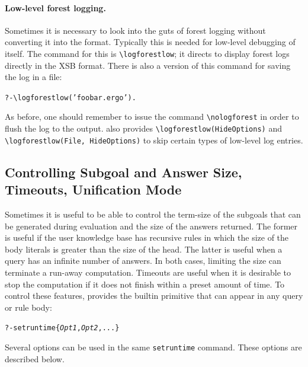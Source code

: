 \documentclass[11pt]{article}
\newcommand{\ERGO}{\mbox{\smaller{\ensuremath{\cal{E}}\smaller{{\sc{RGO}}}}}\xspace}
\newcommand{\FLSYSTEM}{\ERGO}
\newcommand{\ergoext}{ergo\xspace}
\newcommand{\bs}{\textbackslash}
\begin{document}
\paragraph{Low-level forest logging.}
Sometimes it is necessary to look into the guts of forest logging without
converting it into the \FLSYSTEM format. Typically this is needed for
low-level debugging of \FLSYSTEM itself.
The command for this is
{\tt \bs{}logforestlow}; it directs \FLSYSTEM to display forest logs 
directly in the XSB format.
There is also a version of this command for saving the log in a file:
\begin{alltt}
   ?- \bs{}logforestlow('foobar.\ergoext').
\end{alltt}
As before, one should remember to issue the command \texttt{\bs{}nologforest}
in order to flush the log to the output.
\FLSYSTEM also provides {\tt \bs{}logforestlow(HideOptions)} and 
{\tt \bs{}logforestlow(File, HideOptions)} to skip certain types of low-level 
log entries. 

\subsection{Controlling Subgoal and Answer Size, Timeouts, Unification
  Mode}\label{sec-timeout}

Sometimes it is useful to be able to control the term-size of the subgoals
that can be generated during evaluation and the size of the answers
returned. The former is useful if the user knowledge base has recursive
rules in which the size of the body literals is greater than the size of
the head. The latter is useful when a query has an infinite number of
answers. In both cases, limiting the size can terminate a run-away
computation.
Timeouts are useful when it is desirable to stop the computation if it does
not finish within a preset amount of time.
To control these features, \FLSYSTEM provides the builtin primitive that
can appear in any query or rule body:
\begin{alltt}
   ?- setruntime\{\emph{Opt1},\emph{Opt2},...\}
\end{alltt}
Several options can be used in the same \texttt{setruntime} command. 
These options are described below.
\end{document}

